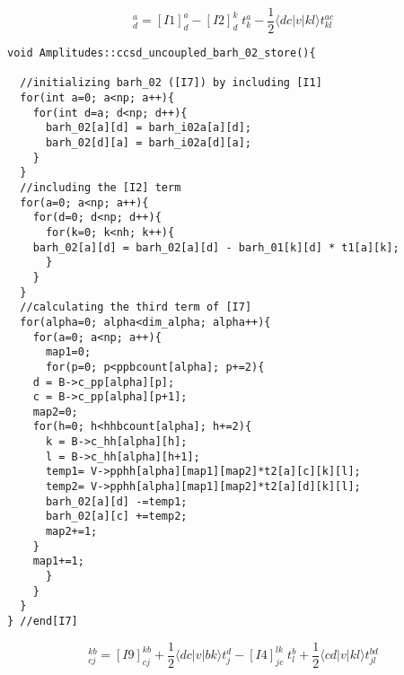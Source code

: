 \begin{equation*}
[I7]_{d}^{a} =[I1]_d^a-[I2]_d^k\phantom{.}t_k^a-\frac{1}{2}\langle dc|v|kl\rangle t_{kl}^{ac}
\end{equation*}
%
\begin{lstlisting}[label={list:impl:intermediate7},caption={implementation of I7 in the amp1 class function ccsd\_uncoupled\_barh\_02\_store}]
void Amplitudes::ccsd_uncoupled_barh_02_store(){
 
  //initializing barh_02 ([I7]) by including [I1]
  for(int a=0; a<np; a++){
    for(int d=a; d<np; d++){
      barh_02[a][d] = barh_i02a[a][d];
      barh_02[d][a] = barh_i02a[d][a];
    }
  }
  //including the [I2] term
  for(a=0; a<np; a++){
    for(d=0; d<np; d++){ 
      for(k=0; k<nh; k++){
	barh_02[a][d] = barh_02[a][d] - barh_01[k][d] * t1[a][k];
      }
    }
  }
  //calculating the third term of [I7]
  for(alpha=0; alpha<dim_alpha; alpha++){
    for(a=0; a<np; a++){ 
      map1=0;
      for(p=0; p<ppbcount[alpha]; p+=2){
	d = B->c_pp[alpha][p];
	c = B->c_pp[alpha][p+1];
	map2=0;
	for(h=0; h<hhbcount[alpha]; h+=2){
	  k = B->c_hh[alpha][h];
	  l = B->c_hh[alpha][h+1];
	  temp1= V->pphh[alpha][map1][map2]*t2[a][c][k][l];
	  temp2= V->pphh[alpha][map1][map2]*t2[a][d][k][l];
	  barh_02[a][d] -=temp1;
	  barh_02[a][c] +=temp2;
	  map2+=1;
	}
	map1+=1;
      }
    }
  }
} //end[I7]
\end{lstlisting}

\begin{equation*}
[I8]_{cj}^{kb}=[I9]_{cj}^{kb}+\frac{1}{2}\langle dc|v|bk\rangle t_j^d-[I4]_{jc}^{lk}\phantom{.}t_l^b+\frac{1}{2}\langle cd|v|kl\rangle t_{jl}^{bd}  
\end{equation*}


